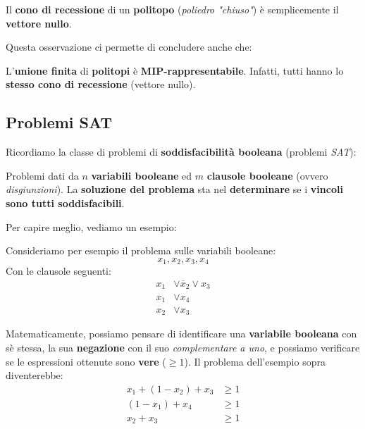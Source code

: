 \begin{remark}
    Il \textbf{cono di recessione} di un \textbf{politopo}
    (\textit{poliedro "chiuso"}) è semplicemente il \textbf{vettore nullo}.
\end{remark}

Questa osservazione ci permette di concludere anche che:

\begin{remark}
    L'\textbf{unione finita} di \textbf{politopi} è
    \textbf{MIP-rappresentabile}. Infatti, tutti hanno lo 
    \textbf{stesso cono di recessione} (vettore nullo).
\end{remark}

\subsection{Problemi SAT}

Ricordiamo la classe di problemi di \textbf{soddisfacibilità booleana}
(problemi \textit{SAT}):

\begin{definition}
    Problemi dati da $n$ \textbf{variabili booleane} ed
    $m$ \textbf{clausole booleane} (ovvero \textit{disgiunzioni}).
    La \textbf{soluzione del problema} sta nel \textbf{determinare}
    se i \textbf{vincoli sono tutti soddisfacibili}.
\end{definition}

Per capire meglio, vediamo un esempio:

\begin{exa}
    Consideriamo per esempio il problema sulle variabili booleane:
    \[
        x_{1},x_{2},x_{3},x_{4}
    \] 
    Con le clausole seguenti:
    \[
        \begin{aligned}
            x_{1} &\lor \overline{x}_2 \lor x_{3} \\ 
            x_{1} &\lor x_{4} \\ 
            x_{2} &\lor x_{3}
        \end{aligned}
    \] 
\end{exa}

Matematicamente, possiamo pensare di identificare una \textbf{variabile booleana}
con sè stessa, la sua \textbf{negazione} con il suo \textit{complementare a uno}, e possiamo
verificare se le espressioni ottenute sono \textbf{vere} ($\ge 1$).
Il problema dell'esempio sopra diventerebbe:
\[
    \begin{aligned}
        x_{1} + (1-x_{2}) + x_{3} &\ge 1 \\ 
        (1-x_{1}) + x_{4} &\ge 1 \\ 
        x_{2} + x_{3} &\ge 1
    \end{aligned}
\]

